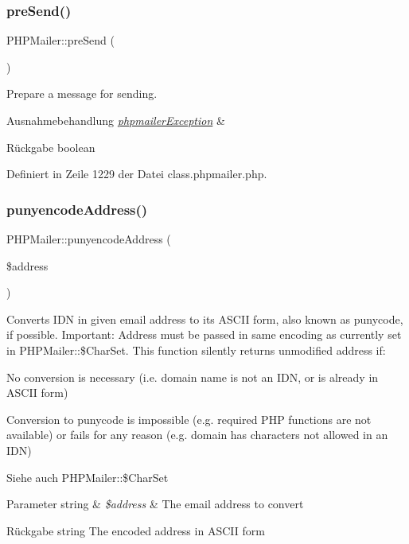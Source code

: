 \subsubsection{\texorpdfstring{pre\+Send()}{preSend()}}
{\footnotesize\ttfamily P\+H\+P\+Mailer\+::pre\+Send (\begin{DoxyParamCaption}{ }\end{DoxyParamCaption})}

Prepare a message for sending. 
\begin{DoxyExceptions}{Ausnahmebehandlung}
{\em \mbox{\hyperlink{classphpmailer_exception}{phpmailer\+Exception}}} & \\
\hline
\end{DoxyExceptions}
\begin{DoxyReturn}{Rückgabe}
boolean 
\end{DoxyReturn}


Definiert in Zeile 1229 der Datei class.\+phpmailer.\+php.

\mbox{\label{class_p_h_p_mailer_a7e684e6070c16bfe7abef4bc11c48f42}} 
\subsubsection{\texorpdfstring{punyencode\+Address()}{punyencodeAddress()}}
{\footnotesize\ttfamily P\+H\+P\+Mailer\+::punyencode\+Address (\begin{DoxyParamCaption}\item[{}]{\$address }\end{DoxyParamCaption})}

Converts I\+DN in given email address to its A\+S\+C\+II form, also known as punycode, if possible. Important\+: Address must be passed in same encoding as currently set in P\+H\+P\+Mailer\+::\$\+Char\+Set. This function silently returns unmodified address if\+:
\begin{DoxyItemize}
\item No conversion is necessary (i.\+e. domain name is not an I\+DN, or is already in A\+S\+C\+II form)
\item Conversion to punycode is impossible (e.\+g. required P\+HP functions are not available) or fails for any reason (e.\+g. domain has characters not allowed in an I\+DN) \begin{DoxySeeAlso}{Siehe auch}
P\+H\+P\+Mailer\+::\$\+Char\+Set 
\end{DoxySeeAlso}

\begin{DoxyParams}[1]{Parameter}
string & {\em \$address} & The email address to convert \\
\hline
\end{DoxyParams}
\begin{DoxyReturn}{Rückgabe}
string The encoded address in A\+S\+C\+II form 
\end{DoxyReturn}

\end{DoxyItemize}

